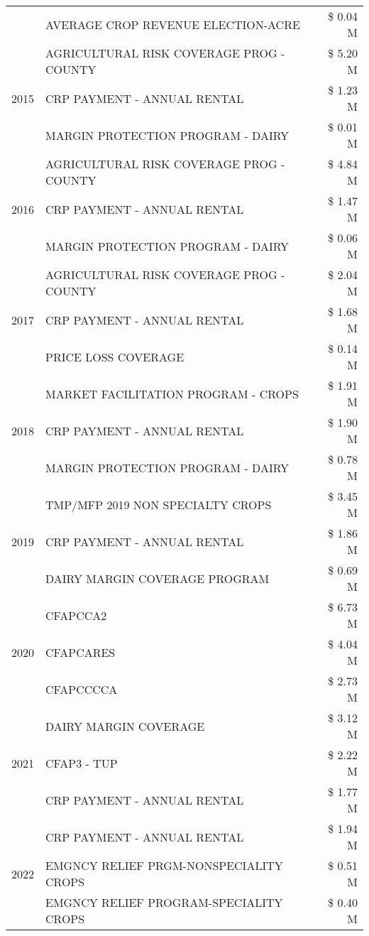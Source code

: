 \begin{tabular}{llr}
 & AVERAGE CROP REVENUE ELECTION-ACRE & \$ 0.04 M \\
\cline{1-3}
\multirow[t]{3}{*}{2015} & AGRICULTURAL RISK COVERAGE PROG - COUNTY & \$ 5.20 M \\
 & CRP PAYMENT - ANNUAL RENTAL & \$ 1.23 M \\
 & MARGIN PROTECTION PROGRAM - DAIRY & \$ 0.01 M \\
\cline{1-3}
\multirow[t]{3}{*}{2016} & AGRICULTURAL RISK COVERAGE PROG - COUNTY & \$ 4.84 M \\
 & CRP PAYMENT - ANNUAL RENTAL & \$ 1.47 M \\
 & MARGIN PROTECTION PROGRAM - DAIRY & \$ 0.06 M \\
\cline{1-3}
\multirow[t]{3}{*}{2017} & AGRICULTURAL RISK COVERAGE PROG - COUNTY & \$ 2.04 M \\
 & CRP PAYMENT - ANNUAL RENTAL & \$ 1.68 M \\
 & PRICE LOSS COVERAGE & \$ 0.14 M \\
\cline{1-3}
\multirow[t]{3}{*}{2018} & MARKET FACILITATION PROGRAM - CROPS & \$ 1.91 M \\
 & CRP PAYMENT - ANNUAL RENTAL & \$ 1.90 M \\
 & MARGIN PROTECTION PROGRAM - DAIRY & \$ 0.78 M \\
\cline{1-3}
\multirow[t]{3}{*}{2019} & TMP/MFP 2019 NON SPECIALTY CROPS & \$ 3.45 M \\
 & CRP PAYMENT - ANNUAL RENTAL & \$ 1.86 M \\
 & DAIRY MARGIN COVERAGE PROGRAM & \$ 0.69 M \\
\cline{1-3}
\multirow[t]{3}{*}{2020} & CFAPCCA2 & \$ 6.73 M \\
 & CFAPCARES & \$ 4.04 M \\
 & CFAPCCCCA & \$ 2.73 M \\
\cline{1-3}
\multirow[t]{3}{*}{2021} & DAIRY MARGIN COVERAGE & \$ 3.12 M \\
 & CFAP3 - TUP & \$ 2.22 M \\
 & CRP PAYMENT - ANNUAL RENTAL & \$ 1.77 M \\
\cline{1-3}
\multirow[t]{3}{*}{2022} & CRP PAYMENT - ANNUAL RENTAL & \$ 1.94 M \\
 & EMGNCY RELIEF PRGM-NONSPECIALITY CROPS & \$ 0.51 M \\
 & EMGNCY RELIEF PROGRAM-SPECIALITY CROPS & \$ 0.40 M \\
\cline{1-3}
\bottomrule
\end{tabular}

